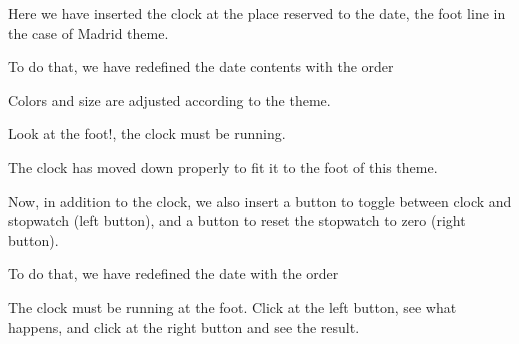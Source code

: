\documentclass[12pt]{beamer}
\begin{document}
%
\date{\raisebox{-1.8pt}\insertclock}
\clockfontsize{6pt}


\begin{frame}

Here we have inserted the clock at the place reserved to the date, the foot line in the case of Madrid theme.

\medskip

To do that, we have redefined the date contents with the order
\medskip

\centerline{ }

\medskip

Colors and size are adjusted according to the theme.

\medskip

Look at the foot!, the clock must be running.

The clock has moved down properly to fit it to the foot of this theme.
\end{frame}

\date{
\inserttogglebutton{}%
\raisebox{-1.8pt}{\insertclock}%
\insertresetbutton{}}

\begin{frame}

Now, in addition to the clock, we also insert a button to toggle between clock and stopwatch (left button), and a button to reset the stopwatch to zero (right button).

\medskip

To do that, we have redefined the date with the order

\medskip


\medskip

The clock must be running at the foot. Click at the left button, see what happens,
and click at the right button and see the result.
\end{frame}
\end{document}
